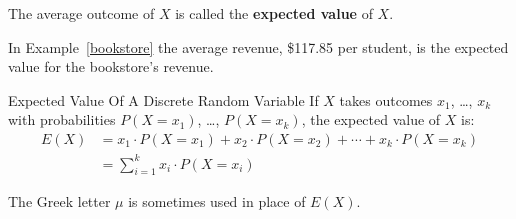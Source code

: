\documentclass{beamer}
\newcommand{\prob}[1]{P\left({#1}\right)}
\begin{document}
\begin{frame}
\begin{definition}
The average outcome of $X$ is called the \textbf{expected value} of $X$.
\end{definition}\pause

\begin{example}
In Example~\ref{bookstore} the average revenue, \$117.85 per student, is the expected value for the bookstore's revenue.

\begin{center}
\end{center}
\end{example}
\end{frame}

\begin{frame}
\begin{block}{Expected Value Of A Discrete Random Variable}
If $X$ takes outcomes $x_1$, \ldots, $x_k$ with probabilities $\prob{X=x_1}$, \ldots, $\prob{X=x_k}$, the expected value of $X$ is:
\begin{equation*}
\begin{aligned}
E(X) &= x_1\cdot\prob{X=x_1} + x_2\cdot\prob{X=x_2} + \cdots + x_k\cdot\prob{X=x_k} \\
&= \sum_{i=1}^{k} x_i\cdot\prob{X=x_i}
\end{aligned}
\end{equation*}\pause
\end{block}

\begin{note}
The Greek letter $\mu$ is sometimes used in place of $E(X)$.
\end{note}
\end{frame}
\end{document}

